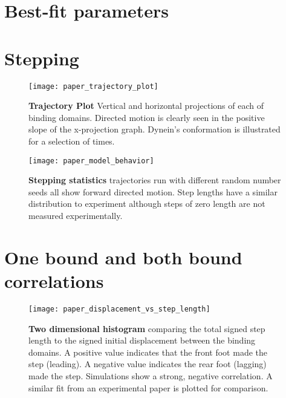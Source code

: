 

\section{Best-fit parameters}
\section{Stepping}
\begin{figure}
	\centering
	\texttt{[image: paper\_trajectory\_plot]}
	\caption{\textbf{Trajectory Plot} Vertical and horizontal projections of each of binding domains. Directed motion is clearly seen in the positive slope of the x-projection graph. Dynein's conformation is illustrated for a selection of times.}
	\label{fig:trajectory}
\end{figure}
	
	
\begin{figure}
	\centering
	\texttt{[image: paper\_model\_behavior]}
	\caption{\textbf{Stepping statistics} trajectories run with different random number seeds all show forward directed motion. Step lengths have a similar distribution to experiment although steps of zero length are not measured experimentally. }
	\label{Fig:statistics}
\end{figure}


\section{One bound and both bound correlations}
\begin{figure}[!hbt]
	\centering
	\texttt{[image: paper\_displacement\_vs\_step\_length]}
	\caption{\textbf{Two dimensional histogram} comparing the total signed step length to
			the signed initial displacement between the binding domains. A positive value
			indicates that the front foot made the step (leading). A negative value
			indicates the rear foot (lagging) made the step. Simulations show a strong,
			negative correlation. A similar fit from an experimental paper is plotted for comparison.}
	\label{fig:displacement_vs_step_length}
\end{figure}
	
